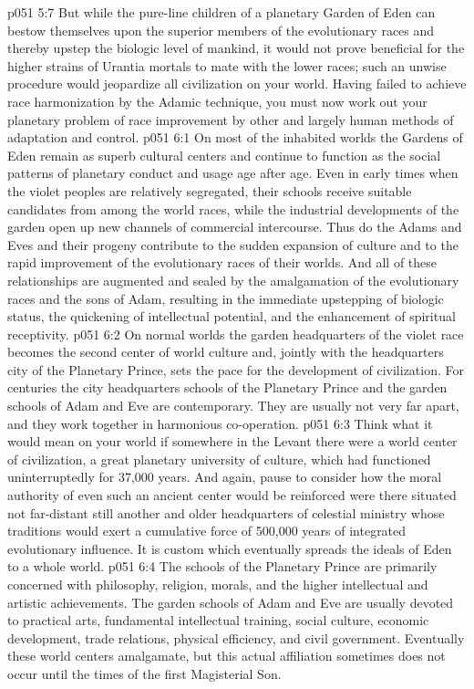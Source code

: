 \vs p051 5:7 But while the pure\hyp{}line children of a planetary Garden of Eden can bestow themselves upon the superior members of the evolutionary races and thereby upstep the biologic level of mankind, it would not prove beneficial for the higher strains of Urantia mortals to mate with the lower races; such an unwise procedure would jeopardize all civilization on your world. Having failed to achieve race harmonization by the Adamic technique, you must now work out your planetary problem of race improvement by other and largely human methods of adaptation and control.
\vs p051 6:1 On most of the inhabited worlds the Gardens of Eden remain as superb cultural centers and continue to function as the social patterns of planetary conduct and usage age after age. Even in early times when the violet peoples are relatively segregated, their schools receive suitable candidates from among the world races, while the industrial developments of the garden open up new channels of commercial intercourse. Thus do the Adams and Eves and their progeny contribute to the sudden expansion of culture and to the rapid improvement of the evolutionary races of their worlds. And all of these relationships are augmented and sealed by the amalgamation of the evolutionary races and the sons of Adam, resulting in the immediate upstepping of biologic status, the quickening of intellectual potential, and the enhancement of spiritual receptivity.
\vs p051 6:2 On normal worlds the garden headquarters of the violet race becomes the second center of world culture and, jointly with the headquarters city of the Planetary Prince, sets the pace for the development of civilization. For centuries the city headquarters schools of the Planetary Prince and the garden schools of Adam and Eve are contemporary. They are usually not very far apart, and they work together in harmonious co\hyp{}operation.
\vs p051 6:3 Think what it would mean on your world if somewhere in the Levant there were a world center of civilization, a great planetary university of culture, which had functioned uninterruptedly for 37,000 years. And again, pause to consider how the moral authority of even such an ancient center would be reinforced were there situated not far\hyp{}distant still another and older headquarters of celestial ministry whose traditions would exert a cumulative force of 500,000 years of integrated evolutionary influence. It is custom which eventually spreads the ideals of Eden to a whole world.
\vs p051 6:4 The schools of the Planetary Prince are primarily concerned with philosophy, religion, morals, and the higher intellectual and artistic achievements. The garden schools of Adam and Eve are usually devoted to practical arts, fundamental intellectual training, social culture, economic development, trade relations, physical efficiency, and civil government. Eventually these world centers amalgamate, but this actual affiliation sometimes does not occur until the times of the first Magisterial Son.
